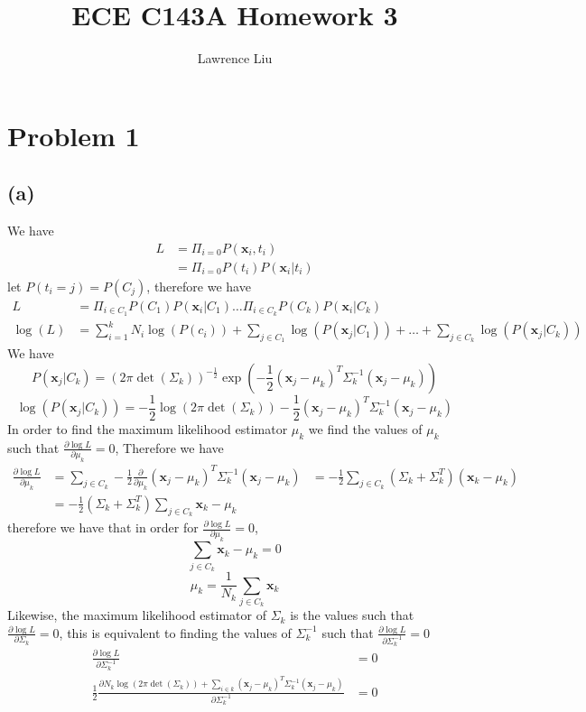 \documentclass[12pt]{article}
\title{ECE C143A Homework 3}
\author{Lawrence Liu}
\begin{document}
\maketitle
\section*{Problem 1}
\subsection*{(a)}
We have
\begin{align*}
    L&=\Pi_{i=0}P(\textbf{x}_i,t_i)\\
    &=\Pi_{i=0}P(t_i)P(\textbf{x}_i|t_i)
\end{align*}
let $P(t_i=j)=P(C_j)$, therefore we have
\begin{align*}
    L&=\Pi_{i\in C_1}P(C_1)P(\textbf{x}_i|C_1)\dots \Pi_{i\in C_k}P(C_k)P(\textbf{x}_i|C_k)\\
    \log(L)&=\sum_{i=1}^{k}N_i\log(P(c_i))+\sum_{j\in C_1}\log(P(\textbf{x}_j|C_1))+
                    \dots+\sum_{j\in C_k}\log(P(\textbf{x}_j|C_k))
\end{align*}
We have
$$P(\textbf{x}_j|C_k)=(2\pi\det(\Sigma_k))^{-\frac{1}{2}}\exp(-\frac{1}{2}(\textbf{x}_j-\mu_k)^T\Sigma_k^{-1}(\textbf{x}_j-\mu_k))$$
$$\log(P(\textbf{x}_j|C_k))=-\frac{1}{2}\log(2\pi\det(\Sigma_k))-\frac{1}{2}(\textbf{x}_j-\mu_k)^T\Sigma_k^{-1}(\textbf{x}_j-\mu_k)$$
In order to find the maximum likelihood estimator $\mu_k$ we find the values of $\mu_k$ such that $\frac{\partial \log{L}}{\partial \mu_k}=0$,
Therefore we have
\begin{align*}
\frac{\partial \log{L}}{\partial \mu_k}&=\sum_{j\in C_k}-\frac{1}{2}\frac{\partial}{\partial\mu_k}(\textbf{x}_j-\mu_k)^T\Sigma_k^{-1}(\textbf{x}_j-\mu_k)
&=-\frac{1}{2}\sum_{j\in C_k}(\Sigma_k+\Sigma_k^{T})(\textbf{x}_k-\mu_k)\\
&=-\frac{1}{2}(\Sigma_k+\Sigma_k^{T})\sum_{j\in C_k}\textbf{x}_k-\mu_k
\end{align*}
therefore we have that in order for $\frac{\partial \log{L}}{\partial \mu_k}=0$,
$$\sum_{j\in C_k}\textbf{x}_k-\mu_k=0$$
$$\boxed{\mu_k=\frac{1}{N_k}\sum_{j\in C_k}\textbf{x}_k}$$
Likewise, the maximum likelihood estimator of $\Sigma_k$ is the values such that $\frac{\partial \log{L}}{\partial \Sigma_k}=0$, this is equivalent to finding the values of
$\Sigma_k^{-1}$ such that $\frac{\partial \log{L}}{\partial \Sigma_k^{-1}}=0$
\begin{align*}
\frac{\partial \log{L}}{\partial \Sigma_k^{-1}}&=0\\
\frac{1}{2}\frac{\partial N_k\log(2\pi\det(\Sigma_k))+\sum_{i\in k}(\textbf{x}_j-\mu_k)^T\Sigma_k^{-1}(\textbf{x}_j-\mu_k)}{\partial \Sigma_k^{-1}}&=0
\end{align*}
\end{document}

